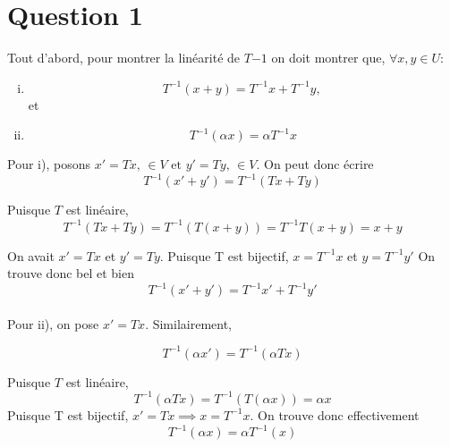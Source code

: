 \documentclass[letterpaper,12pt,oneside,final]{book}
\begin{document}



\newcommand\monPrenom{Frédéric}		%
\newcommand\monNom{Laguë}			%
\newcommand\monMatricule{1986131}	%
\newcommand\monGroupe{01}		%






\section*{Question 1}


Tout d'abord, pour montrer la linéarité de \( T{-1} \) on doit montrer que, \(\forall x,y \in U\):
\begin{enumerate}[i)]
    \item \[ T^{-1}(x+y) = T^{-1} x + T^{-1} y, \, \] et 
    \item \[ T^{-1}(\alpha x) = \alpha T^{-1}x \] 
\end{enumerate}

Pour i), posons \( x' = Tx, \, \in V  \text{ et } y' = Ty, \, \in V \). On peut donc écrire
\[ T ^{-1}(x' + y') = T^{-1}(Tx+Ty)  \]

Puisque \( T \) est linéaire, 
\[T^{-1}(Tx + Ty) = T^{-1}(T(x+y)) = T^{-1} T (x+y) = x+y  \] 

On avait \( x' = Tx\) et \( y' = Ty \). Puisque T est bijectif, \( x = T^{-1}x \) et \( y = T^{-1}y' \)
On trouve donc bel et bien
\[ T^{-1}(x' + y') = T^{-1}x' + T^{-1}y' \] 
\\ 

Pour ii), on pose \( x' = Tx  \). Similairement,

\[ T^{-1}(\alpha x') = T^{-1}(\alpha Tx)  \]

Puisque \( T  \) est linéaire, 
\[ T^{-1}(\alpha Tx ) = T^{-1}(T(\alpha x)) =  \alpha x\]
Puisque T est bijectif, \( x' = Tx \implies x = T^{-1} x \). 
On trouve donc effectivement
\[ T^{-1}(\alpha x) = \alpha T^{-1} (x)  \]
\end{document}
